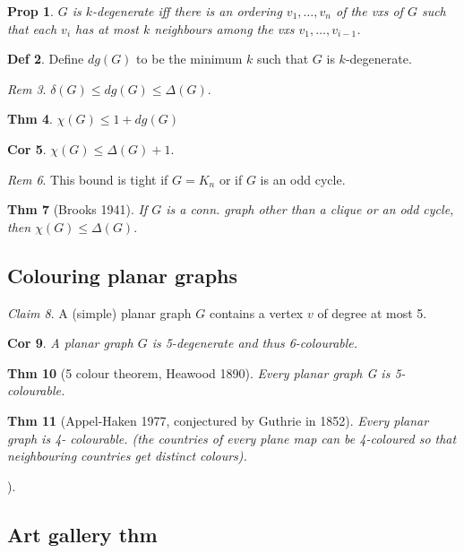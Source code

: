 \documentclass[11pt, fleqn, a4paper, landscape]{article}
\theoremstyle{plain} %
\newtheorem{thm}{Thm}
\newtheorem{pro}[thm]{Prop}
\newtheorem{cor}[thm]{Cor}
\theoremstyle{remark} %
\newtheorem{rem}[thm]{Rem}
\newtheorem{claim}[thm]{Claim}
\theoremstyle{definition} %
\newtheorem{defi}[thm]{Def}
\begin{document}
\begin{multicols}{5}
\begin{pro}
$G$ is $k$-degenerate iff there is an ordering $v_1, \dots , v_n$ of the vxs of $G$ such that each $v_i$ has at most $k$ neighbours among the vxs $v_1, \dots , v_{i-1}$.
\end{pro}

\begin{defi}
Define $dg(G)$ to be the minimum $k$ such that $G$ is $k$-degenerate.
\end{defi}
\begin{rem}
$\delta(G) \le dg(G) \le \Delta(G)$.
\end{rem}

\begin{thm}
$\chi(G) \le 1 + dg(G)$
\end{thm}

\begin{cor}
$\chi(G) \le \Delta(G) + 1.$
\end{cor}

\begin{rem}
This bound is tight if $G = K_n$ or if $G$ is an odd cycle.
\end{rem}

\begin{thm}[Brooks 1941]
If $G$ is a conn. graph other than a clique or an odd cycle, then
$\chi(G) \le \Delta(G).$
\end{thm}

\subsection{Colouring planar graphs}
\begin{claim}
A (simple) planar graph $G$ contains a vertex $v$ of degree at most 5.
\end{claim}

\begin{cor}
A planar graph $G$ is 5-degenerate and thus 6-colourable.
\end{cor}
\begin{thm}[5 colour theorem, Heawood 1890]
Every planar graph G is 5-colourable.
\end{thm}

\begin{thm}[Appel-Haken 1977, conjectured by Guthrie in 1852]
Every planar graph is 4-
colourable. (the countries of every plane map can be 4-coloured so that neighbouring countries get
distinct colours).
\end{thm}). 
\addtocounter{thm}{1}
\subsection{Art gallery thm}


\end{multicols}
\end{document}

